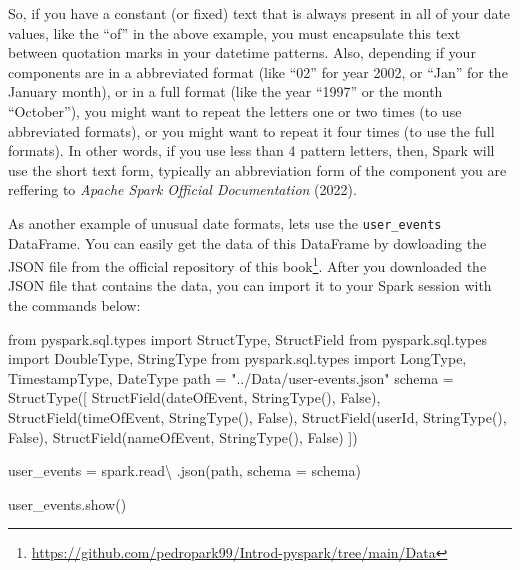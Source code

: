 \documentclass[
  11pt,
  letterpaper,
  DIV=11,
  numbers=noendperiod]{scrreprt}
\newenvironment{Shaded}{\begin{snugshade}}{\end{snugshade}}
\newcommand{\ImportTok}[1]{\textcolor[rgb]{0.00,0.46,0.62}{#1}}
\newcommand{\NormalTok}[1]{\textcolor[rgb]{0.00,0.23,0.31}{#1}}
\newcommand{\OperatorTok}[1]{\textcolor[rgb]{0.37,0.37,0.37}{#1}}
\newcommand{\StringTok}[1]{\textcolor[rgb]{0.13,0.47,0.30}{#1}}
\newcommand{\VariableTok}[1]{\textcolor[rgb]{0.07,0.07,0.07}{#1}}
\begin{document}
So, if you have a constant (or fixed) text that is always present in all
of your date values, like the ``of'' in the above example, you must
encapsulate this text between quotation marks in your datetime patterns.
Also, depending if your components are in a abbreviated format (like
``02'' for year 2002, or ``Jan'' for the January month), or in a full
format (like the year ``1997'' or the month ``October''), you might want
to repeat the letters one or two times (to use abbreviated formats), or
you might want to repeat it four times (to use the full formats). In
other words, if you use less than 4 pattern letters, then, Spark will
use the short text form, typically an abbreviation form of the component
you are reffering to \emph{Apache Spark Official Documentation} (2022).

As another example of unusual date formats, lets use the
\texttt{user\_events} DataFrame. You can easily get the data of this
DataFrame by dowloading the JSON file from the official repository of
this book\footnote{\url{https://github.com/pedropark99/Introd-pyspark/tree/main/Data}}.
After you downloaded the JSON file that contains the data, you can
import it to your Spark session with the commands below:

\begin{Shaded}
\begin{Highlighting}[]
\ImportTok{from}\NormalTok{ pyspark.sql.types }\ImportTok{import}\NormalTok{ StructType, StructField}
\ImportTok{from}\NormalTok{ pyspark.sql.types }\ImportTok{import}\NormalTok{ DoubleType, StringType}
\ImportTok{from}\NormalTok{ pyspark.sql.types }\ImportTok{import}\NormalTok{ LongType, TimestampType, DateType}
\NormalTok{path }\OperatorTok{=} \StringTok{"../Data/user{-}events.json"}
\NormalTok{schema }\OperatorTok{=}\NormalTok{ StructType([}
\NormalTok{    StructField(}\StringTok{\textquotesingle{}dateOfEvent\textquotesingle{}}\NormalTok{, StringType(), }\VariableTok{False}\NormalTok{),}
\NormalTok{    StructField(}\StringTok{\textquotesingle{}timeOfEvent\textquotesingle{}}\NormalTok{, StringType(), }\VariableTok{False}\NormalTok{),}
\NormalTok{    StructField(}\StringTok{\textquotesingle{}userId\textquotesingle{}}\NormalTok{, StringType(), }\VariableTok{False}\NormalTok{),}
\NormalTok{    StructField(}\StringTok{\textquotesingle{}nameOfEvent\textquotesingle{}}\NormalTok{, StringType(), }\VariableTok{False}\NormalTok{)}
\NormalTok{])}

\NormalTok{user\_events }\OperatorTok{=}\NormalTok{ spark.read}\OperatorTok{\textbackslash{}}
\NormalTok{    .json(path, schema }\OperatorTok{=}\NormalTok{ schema)}

\NormalTok{user\_events.show()}
\end{Highlighting}
\end{Shaded}
\end{document}
